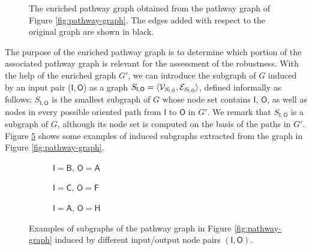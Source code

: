 \begin{figure}[h!]
    \centering
    \resizebox{.6\textwidth}{!}{}
    \caption{The enriched pathway graph obtained from the pathway graph of Figure \ref{fig:pathway-graph}. The edges added with respect to the original graph are shown in black.}
    \label{fig:pathway-graph-enriched}
\end{figure}
The purpose of the enriched pathway graph is to determine which portion of the associated pathway graph is relevant for the assessment of the robustness. With the help of the enriched graph $G'$, we can introduce the subgraph of $G$ induced by an input pair ($\mathsf{I},\mathsf{O}$) as a graph $S_{\mathsf{I},\mathsf{O}} = \Tuple{\Cal{V}_{S_{\mathsf{I},\mathsf{O}}}, \Cal{E}_{S_{\mathsf{I},\mathsf{O}}}}$, defined informally as follows: $S_{\mathsf{I},\mathsf{O}}$ is the smallest subgraph of $G$ whose node set contains $\mathsf{I}$, $\mathsf{O}$, as well as nodes in every possible oriented path from $\mathsf{I}$ to $\mathsf{O}$ in $G'$. We remark that $S_{\mathsf{I},\mathsf{O}}$ is a subgraph of $G$, although its node set is computed on the basis of the paths in $G'$. Figure \ref{fig:subgraphs} shows some examples of induced subgraphs extracted from the graph in Figure \ref{fig:pathway-graph}.
\begin{figure}[h!]
    \begin{subfigure}[b]{0.24\linewidth}
        \centering
        \resizebox{.9\textwidth}{!}{}
        \caption{$\mathsf{I}=\mathsf{B},\, \mathsf{O}=\mathsf{A}$}\label{subfig:subgraph1}
    \end{subfigure}
    \begin{subfigure}[b]{0.29\linewidth}
        \centering
        \resizebox{.9\textwidth}{!}{}
        \caption{$\mathsf{I}=\mathsf{C},\, \mathsf{O}=\mathsf{F}$}\label{subfig:subgraph2}
    \end{subfigure}
    \begin{subfigure}[b]{0.44\linewidth}
        \centering
        \resizebox{.9\textwidth}{!}{}
        \caption{$\mathsf{I}=\mathsf{A},\, \mathsf{O}=\mathsf{H}$}\label{subfig:subgraph3}
    \end{subfigure}
    \caption{Examples of subgraphs of the pathway graph in Figure \ref{fig:pathway-graph} induced by different input/output node pairs $(\mathsf{I},\mathsf{O})$.}\label{fig:subgraphs}
\end{figure}

